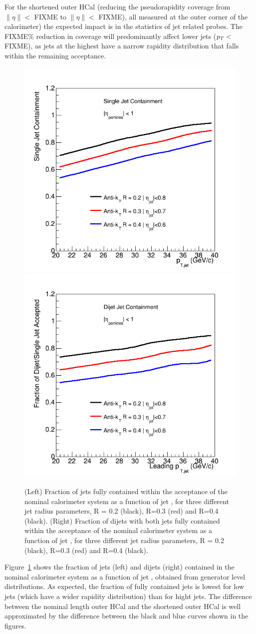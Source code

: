 For the shortened outer HCal (reducing the pseudorapidity coverage from $\| \eta \| <$ FIXME to $\| \eta \| < $ FIXME), all measured
at the outer corner of the calorimeter) the expected impact 
is in the statistics of jet related probes. The FIXME\% reduction in coverage will predominantly affect lower \pt jets ($\mbox{${p_T}$} <$ FIXME),
as jets at the highest \pT have a narrow rapidity distribution that falls within the remaining acceptance. 
\begin{figure}[hbt]
  \centering
  \includegraphics[width=0.4\linewidth]{figs/SingleJet_eta_reference}
  \hspace{0.1\linewidth}
  \includegraphics[width=0.4\linewidth]{figs/Dijet_eta_reference}
  \caption{(Left) 
  Fraction of jets fully contained within the acceptance of the nominal calorimeter system as a function
  of jet \pt, for three different jet radius parameters, R = 0.2 (black), R=0.3 (red) and R=0.4 (black). 
   (Right) 
  Fraction of dijets with both jets fully contained within the acceptance of the nominal calorimeter system as a function
  of jet \pt, for three different jet radius parameters, R = 0.2 (black), R=0.3 (red) and R=0.4 (black).}
  \label{fig:jet_containment_nominal}
\end{figure}
Figure~\ref{fig:jet_containment_nominal} shows the fraction of jets (left) and dijets (right) contained in the nominal calorimeter 
system as a function of jet \pt, obtained from generator level distributions. As expected, the fraction of fully contained jets is lowest for low \pT jets (which have a wider
rapidity distribution) than for hight \pt jets. The difference between the nominal length outer HCal and the shortened outer HCal
is well approximated by the difference between the black and blue curves shown in the figures.

